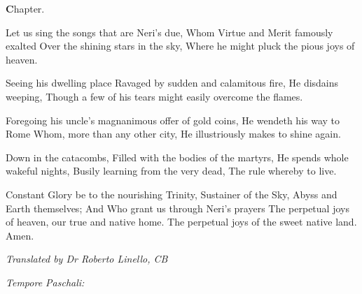 \documentclass[letterpaper,12pt]{article} %
\begin{document}
\normalsize
\begin{center}{\large\textbf Chapter.}\end{center}
\begin{parcolumns}[rulebetween]{2}
\end{parcolumns}
\medskip

\large
{}
\normalsize
{}
\begin{multicols}{2}
\begin{psalmverses}
{\item Let us sing the songs that are Neri's due,
Whom Virtue and Merit famously exalted
Over the shining stars in the sky,
Where he might pluck the pious joys of heaven.

\item Seeing his dwelling place
Ravaged by sudden and calamitous fire,
He disdains weeping,
Though a few of his tears might easily overcome the flames.

\item Foregoing his uncle's magnanimous offer of gold coins,
He wendeth his way to Rome
Whom, more than any other city,
He illustriously makes to shine again.

\item Down in the catacombs,
Filled with the bodies of the martyrs,
He spends whole wakeful nights,
Busily learning from the very dead,
The rule whereby to live.

\item Constant Glory be to the nourishing Trinity,
Sustainer of the Sky, Abyss and Earth themselves;
And Who grant us through Neri's prayers
The perpetual joys of heaven, our true and native home.
The perpetual joys of the sweet native land. Amen.
}
\end{psalmverses}
\begin{flushright}\emph{Translated by Dr Roberto Linello, CB}\end{flushright}
\end{multicols}
\emph{Tempore Paschali:}
\end{document}

